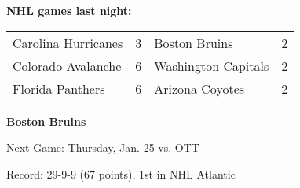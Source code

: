 \textbf{NHL games last night:
}\begin{tabular}{llll}
\toprule
Carolina Hurricanes & 3 &       Boston Bruins & 2 \\
 Colorado Avalanche & 6 & Washington Capitals & 2 \\
   Florida Panthers & 6 &     Arizona Coyotes & 2 \\
\bottomrule
\end{tabular}

\textbf{Boston Bruins}

Next Game: Thursday, Jan. 25 vs. OTT

Record: 29-9-9 (67 points), 1st in NHL Atlantic 
